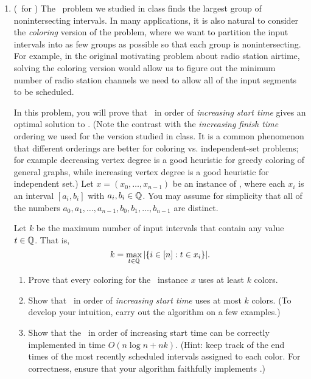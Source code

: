 \documentclass[11pt]{article}
\begin{document}
\begin{enumerate}
 \item (\GreedyColoring\ for \IntervalScheduling) The \IntervalSchedulingOptimization\ problem we studied in class finds the largest group of nonintersecting intervals. 
 In many applications, it is also natural to consider the {\em coloring} version of the problem, where we want to partition the input intervals into as few groups as possible so that each group is nonintersecting.
 For example, in the original motivating problem about radio station airtime, solving the coloring version would allow us to figure out the minimum number of radio station channels we need to allow all of the input segments to be scheduled.
 
 In this problem, you will prove that \GreedyColoring\ in order of {\em increasing start time} gives an optimal solution to \IntervalSchedulingColoring.  (Note the contrast with the {\em increasing finish time} ordering we used for the version studied in class. It is a common phenomenon that different orderings are better for coloring vs. independent-set problems; for example decreasing vertex degree is a good heuristic for greedy coloring of general graphs, while increasing vertex degree is a good heuristic for independent set.)  Let $x=(x_0,\ldots,x_{n-1})$ be an instance of \IntervalScheduling, where each $x_i$ is an interval $[a_i,b_i]$ with $a_i,b_i\in \mathbb{Q}$.  You may assume for simplicity that all of the numbers $a_0,a_1,\ldots,a_{n-1},b_0,b_1,\ldots,b_{n-1}$ are distinct.


Let $k$ be the maximum number of input intervals that contain any value $t\in \mathbb{Q}$.  That is, $$k = \max_{t\in \mathbb{Q}} |\{ i\in [n]: t\in x_i\}|.$$
 
 \begin{enumerate}
     \item Prove that every coloring for the \IntervalScheduling\ instance $x$ uses at least $k$ colors.
     \item Show that \GreedyColoring\ in order of {\em increasing start time} uses at most $k$ colors.  (To develop your intuition, carry out the algorithm on a few examples.)
     \item Show that the \GreedyColoring\ in order of increasing start time can be correctly implemented in time $O(n\log n+nk)$. 
     (Hint: keep track of the end times of the most recently scheduled intervals assigned to each color.  For correctness, ensure that your algorithm faithfully implements \GreedyColoring.) 


\end{enumerate}
\end{enumerate}
\end{document}
